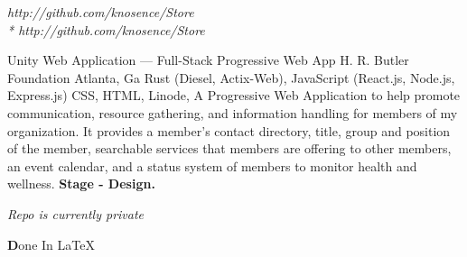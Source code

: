 \documentclass{resume-class/nadario_resume}
\begin{document}
          {}{\textit{http://github.com/knosence/Store \\* http://github.com/knosence/Store}}


        {Unity Web Application --- Full-Stack Progressive Web App}
        {H. R. Butler Foundation}
        {Atlanta, Ga}
        {}{Rust (Diesel, Actix-Web), JavaScript (React.js, Node.js, Express.js) CSS, HTML, Linode, }
          \indent A Progressive Web Application to help promote communication, resource gathering, and information handling for members of my organization. It provides a member's contact directory, title, group and position of the member, searchable services that members are offering to other members, an event calendar, and a status system of members to monitor health and wellness.
          \textbf{Stage - Design.}

        {}{\textit{Repo is currently private}}
        \vspace{.25cm}


        \begin{center} \textbf Done In \LaTeX \end{center}
\end{document}
